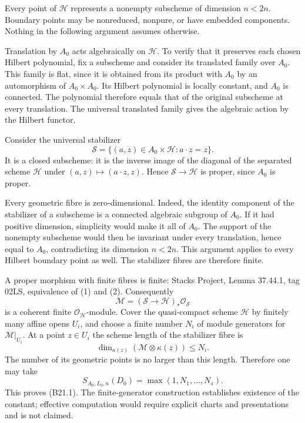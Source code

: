 \documentclass[11pt,a4paper]{article}
\theoremstyle{definition}
\begin{document}
Every point of \(\mathcal H\) represents a nonempty subscheme of dimension \(n<2n\). Boundary points may be nonreduced, nonpure, or have embedded components. Nothing in the following argument assumes otherwise.

Translation by \(A_0\) acts algebraically on \(\mathcal H\). To verify that it preserves each chosen Hilbert polynomial, fix a subscheme and consider its translated family over \(A_0\). This family is flat, since it is obtained from its product with \(A_0\) by an automorphism of \(A_0\times A_0\). Its Hilbert polynomial is locally constant, and \(A_0\) is connected. The polynomial therefore equals that of the original subscheme at every translation. The universal translated family gives the algebraic action by the Hilbert functor.

Consider the universal stabilizer \[
 \mathcal S=\{(a,z)\in A_0\times\mathcal H:a\cdot z=z\}.
\tag{B21.4}
\] It is a closed subscheme: it is the inverse image of the diagonal of the separated scheme \(\mathcal H\) under \((a,z)\mapsto(a\cdot z,z)\). Hence \(\mathcal S\to\mathcal H\) is proper, since \(A_0\) is proper.

Every geometric fibre is zero-dimensional. Indeed, the identity component of the stabilizer of a subscheme is a connected algebraic subgroup of \(A_0\). If it had positive dimension, simplicity would make it all of \(A_0\). The support of the nonempty subscheme would then be invariant under every translation, hence equal to \(A_0\), contradicting its dimension \(n<2n\). This argument applies to every Hilbert boundary point as well. The stabilizer fibres are therefore finite.

A proper morphism with finite fibres is finite: Stacks Project, Lemma 37.44.1, tag 02LS, equivalence of (1) and (2). Consequently \[
 \mathcal M=(\mathcal S\to\mathcal H)_*\mathcal O_{\mathcal S}
\] is a coherent finite \(\mathcal O_{\mathcal H}\)-module. Cover the quasi-compact scheme \(\mathcal H\) by finitely many affine opens \(U_i\), and choose a finite number \(N_i\) of module generators for \(\mathcal M|_{U_i}\). At a point \(z\in U_i\) the scheme length of the stabilizer fibre is \[
 \dim_{\kappa(z)}(\mathcal M\otimes\kappa(z))\le N_i.
\] The number of its geometric points is no larger than this length. Therefore one may take \[
 S_{A_0,L_0,n}(D_0)=\max(1,N_1,\ldots,N_s).
\] This proves (B21.1). The finite-generator construction establishes existence of the constant; effective computation would require explicit charts and presentations and is not claimed.
\end{document}
